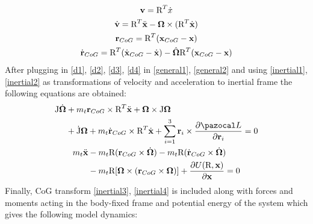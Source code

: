 \begin{gather}
	\textbf{v} = \text{R}^T \dot{x} \label{inertial1}\\
	\dot{\textbf{v}} = \text{R}^T \ddot{\textbf{x}} - \boldsymbol{\Omega} \times (\text{R}^T \dot{\textbf{x}} ) \label{inertial2} \\
	\textbf{r}_{CoG} = \text{R}^T(\textbf{x}_{CoG} - \textbf{x}) \label{inertial3} \\
	\dot{\textbf{r}}_{CoG} = \text{R}^T(\dot{\textbf{x}}_{CoG} - \dot{\textbf{x}}) - \hat{\boldsymbol{\Omega}}\text{R}^T(\textbf{x}_{CoG} - \textbf{x}) \label{inertial4}
\end{gather}
After plugging in \ref{d1}, \ref{d2}, \ref{d3}, \ref{d4} in \ref{general1}, \ref{general2} and using \ref{inertial1}, \ref{inertial2} as transformations of velocity and acceleration to inertial frame the following equations are obtained:
\begin{gather}
\begin{align}
	\begin{split}
		\text{J}\dot{\mb{\Omega}} &+ m_t \textbf{r}_{CoG} \times \text{R}^T \ddot{\textbf{x}} + \mb{\Omega} \times \text{J}\mb{\Omega} \\
		&+ \dot{\text{J}} \mb{\Omega} + m_t \dot{\textbf{r}}_{CoG} \times \text{R}^T \dot{\textbf{x}} + \sum_{i=1}^{3} \textbf{r}_i \times \frac{\partial \La}{\partial \textbf{r}_i} = 0
	\end{split}
\end{align} \\
\begin{align}
	\begin{split}
		m_t \ddot{\textbf{x}} & - m_t \text{R}(\textbf{r}_{CoG} \times \dot{\mb{\Omega}}) - m_t \text{R}(\dot{\textbf{r}}_{CoG} \times \dot{\mb{\Omega}}) \\
		&- m_t \text{R}[\mb{\Omega} \times (\textbf{r}_{CoG} \times \mb{\Omega})] + \frac{\partial U(\text{R},\textbf{x})}{\partial \textbf{x}} = 0
	\end{split}
\end{align}
\end{gather}
Finally, CoG transform \ref{inertial3}, \ref{inertial4} is included along with forces and moments acting in the body-fixed frame and potential energy of the system which gives the following model dynamics:
